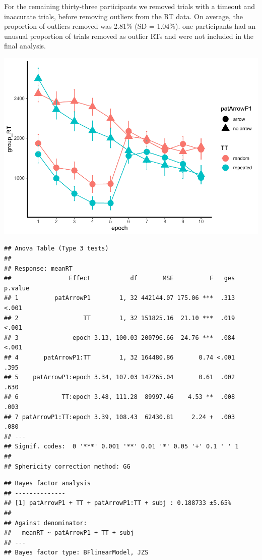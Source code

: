 \documentclass[
  man]{apa6}
\begin{document}
For the remaining thirty-three participants we removed trials with a timeout and inaccurate trials, before removing outliers from the RT data. On average, the proportion of outliers removed was 2.81\% (SD = 1.04\%). one participants had an unusual proportion of trials removed as outlier RTs and were not included in the final analysis.

\includegraphics{CCC_ms1_files/figure-latex/unnamed-chunk-11-1.pdf}

\begin{verbatim}
## Anova Table (Type 3 tests)
## 
## Response: meanRT
##                Effect           df       MSE          F   ges p.value
## 1          patArrowP1        1, 32 442144.07 175.06 ***  .313   <.001
## 2                  TT        1, 32 151825.16  21.10 ***  .019   <.001
## 3               epoch 3.13, 100.03 200796.66  24.76 ***  .084   <.001
## 4       patArrowP1:TT        1, 32 164480.86       0.74 <.001    .395
## 5    patArrowP1:epoch 3.34, 107.03 147265.04       0.61  .002    .630
## 6            TT:epoch 3.48, 111.28  89997.46    4.53 **  .008    .003
## 7 patArrowP1:TT:epoch 3.39, 108.43  62430.81     2.24 +  .003    .080
## ---
## Signif. codes:  0 '***' 0.001 '**' 0.01 '*' 0.05 '+' 0.1 ' ' 1
## 
## Sphericity correction method: GG
\end{verbatim}

\begin{verbatim}
## Bayes factor analysis
## --------------
## [1] patArrowP1 + TT + patArrowP1:TT + subj : 0.188733 ±5.65%
## 
## Against denominator:
##   meanRT ~ patArrowP1 + TT + subj 
## ---
## Bayes factor type: BFlinearModel, JZS
\end{verbatim}
\end{document}
